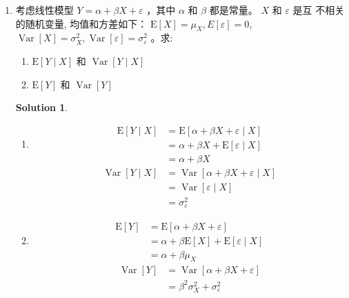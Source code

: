 \documentclass[a4paper,UTF8]{article}
\numberwithin{equation}{section}
\newtheorem*{mySol}{Solution}
\begin{document}
\begin{enumerate}
\item 考虑线性模型 $Y=\alpha+\beta X+\varepsilon$ ，其中 $\alpha$ 和 $\beta$ 都是常量。 $X$ 和 $\varepsilon$ 是互 不相关的随机变量, 均值和方差如下： $\mathrm{E}[X]=\mu_{X}, E[\varepsilon]=0$, $\operatorname{Var}[X]=\sigma_{X}^{2}, \operatorname{Var}[\varepsilon]=\sigma_{\varepsilon}^{2}$ 。求:
	\begin{enumerate}[1)]
		\item $\mathrm{E}[Y \mid X]$ 和 $\operatorname{Var}[Y \mid X]$
		\item $\mathrm{E}[Y]$ 和 $\operatorname{Var}[Y]$
	\end{enumerate}

\begin{mySol}
~\\
    \begin{enumerate}[1)]
	\item \begin{align*}
        \mathrm{E}[Y \mid X] &= \mathrm{E}[\alpha+\beta X+\varepsilon \mid X] \\
        &= \alpha+\beta X+\mathrm{E}[\varepsilon \mid X] \\
        &= \alpha+\beta X
    \end{align*}
    \begin{align*}
        \operatorname{Var}[Y \mid X] &= \operatorname{Var}[\alpha+\beta X+\varepsilon \mid X] \\
        &= \operatorname{Var}[\varepsilon \mid X] \\
        &= \sigma_{\varepsilon}^{2}
    \end{align*}
    \item \begin{align*}
        \mathrm{E}[Y] &= \mathrm{E}[\alpha+\beta X+\varepsilon] \\
        &= \alpha+\beta \mathrm{E}[X]+\mathrm{E}[\varepsilon \mid X] \\
        &= \alpha+\beta \mu_{X}
    \end{align*}
    \begin{align*}
        \operatorname{Var}[Y] &= \operatorname{Var}[\alpha+\beta X+\varepsilon] \\
        &= \beta^2 \sigma_{X}^{2} + \sigma_{\varepsilon}^{2}
    \end{align*}
    \end{enumerate}


\end{mySol}




\end{enumerate}
\end{document}
